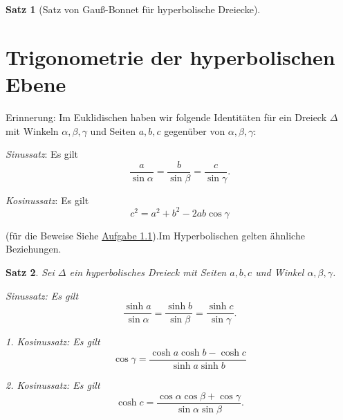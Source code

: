 \documentclass[11pt]{book}
\numberwithin{dummy}{section}
\newtheorem{theorem}{Satz}[section]
\theoremstyle{nonumberbreak}
\newenvironment{pr}[1][]{\ifthenelse{\equal{#1}{}}{\proof}{\proof[#1]}\rm}{\endproof}
\begin{document}
\begin{spacing}{1.4}
\begin{theorem}[Satz von Gauß-Bonnet für hyperbolische Dreiecke]
\begin{pr}



\end{pr}

\end{theorem}












\section{Trigonometrie der hyperbolischen Ebene} %




Erinnerung: Im Euklidischen haben wir folgende Identitäten für ein Dreieck $\Delta$ mit Winkeln $\alpha, \beta, \gamma$ und Seiten $a,b,c$ gegenüber von $\alpha, \beta, \gamma$:
\begin{compactenum}
\item \textit{Sinussatz}: Es gilt
$$\frac{a}{\sin \alpha} = \frac{b}{\sin \beta} = \frac{c}{\sin \gamma}.$$
\item \textit{Kosinussatz}: Es gilt
$$c^2=a^2+b^2- 2 ab \cos \gamma$$
\end{compactenum}

(für die Beweise Siehe \hyperlink{Aeinseins}{Aufgabe 1.1}).Im Hyperbolischen gelten ähnliche Beziehungen.


\begin{theorem}
Sei $\Delta$ ein hyperbolisches Dreieck mit Seiten $a,b,c$ und Winkel $\alpha, \beta, \gamma$.
\begin{compactenum}
\item \textit{Sinussatz}: Es gilt
$$\frac{\sinh a}{\sin \alpha} = \frac{\sinh b}{\sin \beta} = \frac{ \sinh c}{\sin \gamma}.$$
\item \textit{1. Kosinussatz}: Es gilt
$$\cos \gamma= \frac{\cosh a  \cosh b - \cosh c}{\sinh a \sinh b}$$
\item \textit{2. Kosinussatz}: Es gilt
$$\cosh c = \frac{ \cos \alpha \cos \beta + \cos \gamma}{\sin \alpha \sin \beta}.$$
\end{compactenum}


\end{theorem}
\end{spacing}
\end{document}
